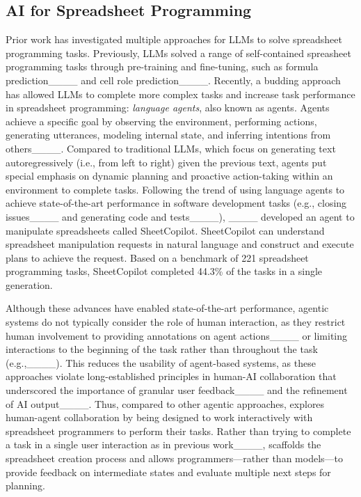 \subsection{AI for Spreadsheet Programming}
\label{sec:llm-agents}
Prior work has investigated multiple approaches for LLMs to solve spreadsheet programming tasks.
Previously, LLMs solved a range of self-contained spreasheet programming tasks through pre-training and fine-tuning, such as formula prediction____ and cell role prediction____.
Recently, a budding approach has allowed LLMs to complete more complex tasks and increase task performance in spreadsheet programming: \emph{language agents}, also known as agents.
Agents achieve a specific goal by observing the environment, performing actions, generating utterances, modeling internal state, and inferring intentions from others____.
Compared to traditional LLMs, which focus on generating text autoregressively (i.e., from left to right) given the previous text, agents put special emphasis on dynamic planning and proactive action-taking within an environment to complete tasks.
Following the trend of using language agents to achieve state-of-the-art performance in software development tasks (e.g., closing issues____ and generating code and tests____), ____ developed an agent to manipulate spreadsheets called SheetCopilot. 
SheetCopilot can understand spreadsheet manipulation requests in natural language and construct and execute plans to achieve the request.
Based on a benchmark of 221 spreadsheet programming tasks, SheetCopilot completed 44.3\% of the tasks in a single generation.

Although these advances have enabled state-of-the-art performance, agentic systems do not typically consider the role of human interaction, as they restrict human involvement to providing annotations on agent actions____ or limiting interactions to the beginning of the task rather than throughout the task (e.g.,____).
This reduces the usability of agent-based systems, as these approaches violate long-established principles in human-AI collaboration that underscored the importance of granular user feedback____ and the refinement of AI output____.
Thus, compared to other agentic approaches, \tool explores human-agent collaboration by being designed to work interactively with spreadsheet programmers to perform their tasks.
Rather than trying to complete a task in a single user interaction as in previous work____, \tool scaffolds the spreadsheet creation process and allows programmers---rather than models---to provide feedback on intermediate states and evaluate multiple next steps for planning.